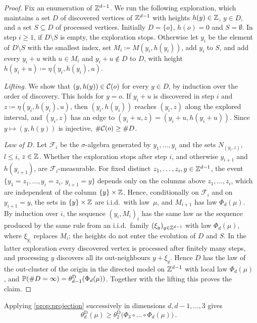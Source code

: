 \documentclass[11pt,letterpaper]{article}
\begin{document}
\begin{proof}
Fix an enumeration of $\Z^{d-1}$. We run the following exploration, which maintains a set $D$ of discovered vertices of $\Z^{d-1}$ with heights $h(y)\in\Z$, $y\in D$, and a set $S\subseteq D$ of processed vertices. Initially $D=\{o\}$, $h(o)=0$ and $S=\emptyset$. In step $i\ge1$, if $D\setminus S$ is empty, the exploration stops. Otherwise let $y_i$ be the element of $D\setminus S$ with the smallest index, set $M_i\coloneqq M(y_i,h(y_i))$, add $y_i$ to $S$, and add every $y_i+u$ with $u\in M_i$ and $y_i+u\notin D$ to $D$, with height $h(y_i+u)\coloneqq\eta(y_i,h(y_i),u)$.

\emph{Lifting.} We show that $(y,h(y))\in\cC(o)$ for every $y\in D$, by induction over the order of discovery. This holds for $y=o$. If $y_i+u$ is discovered in step $i$ and $z\coloneqq\eta(y_i,h(y_i),u)$, then $(y_i,h(y_i))$ reaches $(y_i,z)$ along the explored interval, and $(y_i,z)$ has an edge to $(y_i+u,z)=(y_i+u,h(y_i+u))$. Since $y\mapsto(y,h(y))$ is injective, $\#\cC(o)\ge\#D$.

\emph{Law of $D$.} Let $\mathcal F_i$ be the $\sigma$-algebra generated by $y_1,\dots,y_i$ and the sets $N_{(y_l,z)}$, $l\le i$, $z\in\Z$. Whether the exploration stops after step $i$, and otherwise $y_{i+1}$ and $h(y_{i+1})$, are $\mathcal F_i$-measurable. For fixed distinct $z_1,\dots,z_i,y\in\Z^{d-1}$, the event $\{y_1=z_1,\dots,y_i=z_i,\,y_{i+1}=y\}$ depends only on the columns above $z_1,\dots,z_i$, which are independent of the column $\{y\}\times\Z$. Hence, conditionally on $\mathcal F_i$ and on $y_{i+1}=y$, the sets in $\{y\}\times\Z$ are i.i.d.\ with law~$\mu$, and $M_{i+1}$ has law $\Phi_d(\mu)$. By induction over $i$, the sequence $(y_i,M_i)_i$ has the same law as the sequence produced by the same rule from an i.i.d.\ family $(\xi_y)_{y\in\Z^{d-1}}$ with law $\Phi_d(\mu)$, where $\xi_{y_i}$ replaces $M_i$; the heights do not enter the evolution of $D$ and $S$. In the latter exploration every discovered vertex is processed after finitely many steps, and processing $y$ discovers all its out-neighbours $y+\xi_y$. Hence $D$ has the law of the out-cluster of the origin in the directed model on $\Z^{d-1}$ with local law $\Phi_d(\mu)$, and $\P(\#D=\infty)=\theta^{\mathrm D}_{d-1}(\Phi_d(\mu))$. Together with the lifting this proves the claim.
\end{proof}

Applying \cref{prop:projection} successively in dimensions $d,d-1,\dots,3$ gives
\begin{equation}\label{eq:iterate}
\theta^{\mathrm D}_d(\mu)\ge\theta^{\mathrm D}_2\big(\Phi_3\circ\dots\circ\Phi_d(\mu)\big)\,.
\end{equation}
\end{document}
